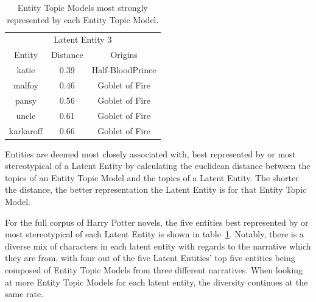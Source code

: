 \documentclass[10pt]{report}
\begin{document}
\begin{table}[h!]
{\begin{tabular}{c | c | c }
    \multicolumn{3}{c}{Latent Entity 3}\\
    Entity    & Distance & Origins\\
    \hline
    katie	    &0.39&	Half-BloodPrince\\
    malfoy	    &0.46&	Goblet of Fire  \\
    pansy	    &0.56&	Goblet of Fire  \\
    uncle	    &0.61&	Goblet of Fire  \\
    karkaroff       &0.66&	Goblet of Fire
  \end{tabular}}
  \caption{Entity Topic Models most strongly represented by each Entity Topic Model.\label{tab:hp_le_fulls}}
\end{table}
\renewcommand{\baselinestretch}{2.0}\normalsize
\renewcommand{\arraystretch}{1.0}

Entities are deemed most closely associated with, best represented by or most stereotypical of a Latent Entity by calculating the euclidean distance between the topics of an Entity Topic Model and the topics of a Latent Entity. The shorter the distance, the better representation the Latent Entity is for that Entity Topic Model.

For the full corpus of Harry Potter novels, the five entities best represented by or most stereotypical of each Latent Entity is shown in table~\ref{tab:hp_le_fulls}. Notably, there is a diverse mix of characters in each latent entity with regards to the narrative which they are from, with four out of the five Latent Entities' top five entities being composed of Entity Topic Models from three different narratives. When looking at more Entity Topic Models for each latent entity, the diversity continues at the same rate.
\end{document}
